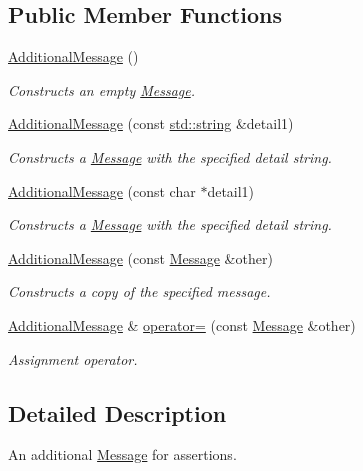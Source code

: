 \subsection*{Public Member Functions}
\begin{DoxyCompactItemize}
\item 
\hyperlink{class_additional_message_a888715179848c5e5c385789b962a3cfb}{Additional\-Message} ()
\begin{DoxyCompactList}\small\item\em Constructs an empty \hyperlink{class_message}{Message}. \end{DoxyCompactList}\item 
\hyperlink{class_additional_message_a990455bbfe260bc04f99e5acc58d1c06}{Additional\-Message} (const \hyperlink{glew_8h_ae84541b4f3d8e1ea24ec0f466a8c568b}{std\-::string} \&detail1)
\begin{DoxyCompactList}\small\item\em Constructs a \hyperlink{class_message}{Message} with the specified detail string. \end{DoxyCompactList}\item 
\hyperlink{class_additional_message_a6486540f9b5d1957230e9e1f969adc9d}{Additional\-Message} (const char $\ast$detail1)
\begin{DoxyCompactList}\small\item\em Constructs a \hyperlink{class_message}{Message} with the specified detail string. \end{DoxyCompactList}\item 
\hyperlink{class_additional_message_a75735b6fd65686f31349d01c97c73bc7}{Additional\-Message} (const \hyperlink{class_message}{Message} \&other)
\begin{DoxyCompactList}\small\item\em Constructs a copy of the specified message. \end{DoxyCompactList}\item 
\hyperlink{class_additional_message}{Additional\-Message} \& \hyperlink{class_additional_message_abbda0de4323f70ff01a9b622a6f550f7}{operator=} (const \hyperlink{class_message}{Message} \&other)
\begin{DoxyCompactList}\small\item\em Assignment operator. \end{DoxyCompactList}\end{DoxyCompactItemize}


\subsection{Detailed Description}
An additional \hyperlink{class_message}{Message} for assertions.


